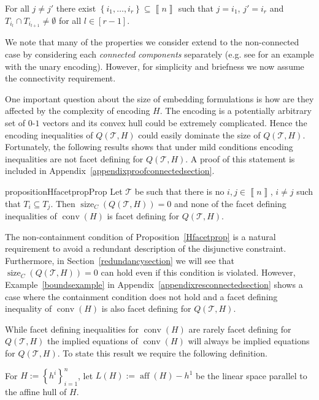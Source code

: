 \documentclass[mnsc]{informs3}
\newcommand{\set}[1]{\left\{#1\right\}}                     %
\newcommand{\bra}[1]{\left(#1\right)}
\newcommand{\sidx}[1]{\left\llbracket     #1 \right\rrbracket}
\DeclareMathOperator{\size}{size}
\DeclareMathOperator{\conv}{conv}
\DeclareMathOperator{\aff}{aff}
\begin{document}
\begin{assumption}[Connectedness] \label{connectedassumption} For all $j\neq j'$ there exist $\set{i_1,\ldots,i_r}\subseteq \sidx{n}$ such that $j=i_1$, $j'=i_r$ and $T_{i_l}\cap T_{i_{l+1}}\neq \emptyset$ for all $l\in [r-1]$.
\end{assumption}

We note that many of the properties we  consider extend to the non-connected case by considering each \emph{connected components} separately (e.g. see \cite{lee01} for an example with the unary encoding). However, for simplicity and briefness we now assume the connectivity requirement. 

One important question about the size of embedding formulations is how are they affected by the complexity of encoding $H$. The encoding is a potentially arbitrary set of $0$-$1$ vectors and its convex hull could be extremely complicated. Hence the encoding inequalities of $Q\bra{\mathcal{T},H}$ could easily dominate the size of $Q\bra{\mathcal{T},H}$. Fortunately, the following results shows that under mild conditions encoding inequalities  are not facet defining for $Q\bra{\mathcal{T},H}$. A proof of this statement is included in Appendix~\ref{appendixproofconnectedsection}.
\begin{restatable}{proposition}{HfacetpropProp}\label{Hfacetprop} Let $\mathcal{T}$ be such that there is no $i,j\in \sidx{n}$, $i\neq j$ such that $T_i\subseteq T_j$. Then $\size_C\bra{Q\bra{\mathcal{T},H}}=0$ and none of the facet defining inequalities of $\conv\bra{H}$ is facet defining for $Q\bra{\mathcal{T},H}$.
\end{restatable}
The non-containment condition of Proposition~\ref{Hfacetprop} is a natural requirement to avoid a redundant description of the disjunctive constraint. Furthermore, in Section~\ref{redundancysection} we will see that $\size_C\bra{Q\bra{\mathcal{T},H}}=0$ can hold even if this condition is violated. However, Example~\ref{boundsexample} in  Appendix~\ref{appendixresconnectedsection} shows a case where the containment condition does not hold and a facet defining inequality of  $\conv\bra{H}$ is also facet defining for $Q\bra{\mathcal{T},H}$.


While facet defining inequalities for $\conv\bra{H}$ are rarely facet defining for $Q\bra{\mathcal{T},H}$ the implied equations of $\conv\bra{H}$ will always be implied equations for $Q\bra{\mathcal{T},H}$. To state this result we require the following definition. 

\begin{definition}For $H:=\set{h^i}_{i=1}^n$, let   $L\bra{H}:=\aff\bra{H}-h^1$ be the linear space parallel to the affine hull of $H$. 
\end{definition}
\end{document}
